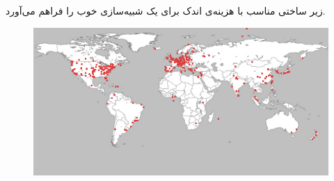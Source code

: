 \documentclass[11pt]{article}
\begin{document}
 زیر ساختی مناسب با هزینه‌ی اندک برای یک شبیه‌سازی خوب را فراهم می‌آورد.

\begin{figure}[h]
	\centering
	\includegraphics[scale=.6]{world}
\end{figure}




\bigskip


\bigskip

%
\end{document}
